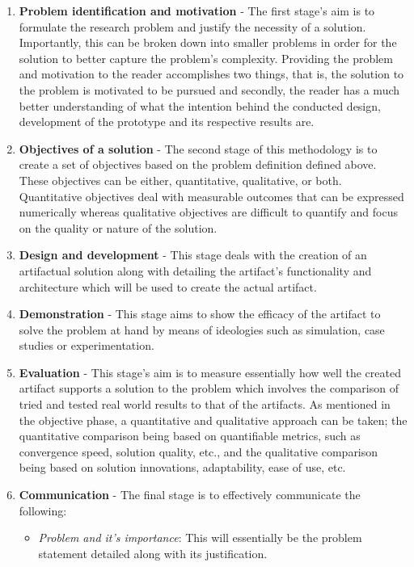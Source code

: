 \begin{enumerate}
    \item \textbf{Problem identification and motivation} - The first stage's aim is to formulate the research problem and justify the necessity of a solution. Importantly, this can be broken down into smaller problems in order for the solution to better capture the problem's complexity. Providing the problem and motivation to the reader accomplishes two things, that is, the solution to the problem is motivated to be pursued and secondly, the reader has a much better understanding of what the intention behind the conducted design, development of the prototype and its respective results are.
    \item \textbf{Objectives of a solution} - The second stage of this methodology is to create a set of objectives based on the problem definition defined above. These objectives can be either, quantitative, qualitative, or both. Quantitative objectives deal with measurable outcomes that can be expressed numerically whereas qualitative objectives are difficult to quantify and focus on the quality or nature of the solution.
    \item \textbf{Design and development} - This stage deals with the creation of an artifactual solution along with detailing the artifact's functionality and architecture which will be used to create the actual artifact.
    \item \textbf{Demonstration} - This stage aims to show the efficacy of the artifact to solve the problem at hand by means of ideologies such as simulation, case studies or experimentation.
    \item \textbf{Evaluation} - This stage's aim is to measure essentially how well the created artifact supports a solution to the problem which involves the comparison of tried and tested real world results to that of the artifacts. As mentioned in the objective phase, a quantitative and qualitative approach can be taken; the quantitative comparison being based on quantifiable metrics, such as convergence speed, solution quality, etc., and the qualitative comparison being based on solution innovations, adaptability, ease of use, etc.
    \item \textbf{Communication} - The final stage is to effectively communicate the following:
    \begin{itemize}
        \item \textit{Problem and it's importance}: This will essentially be the problem statement detailed along with its justification.

\end{itemize}
\end{enumerate}
